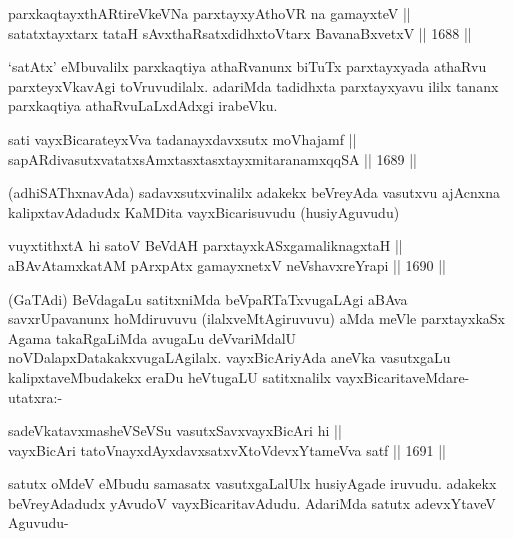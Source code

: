\begin{shl}
parxkaqtayxthARtireVkeVNa parxtayxyAthoVR na gamayxteV || \\
satatxtayxtarx tataH sAvxthaRsatxdidhxtoV\s tarx BavanaBxvetxV ||  1688 ||  
\end{shl}

\begin{artha}
`satAtx' eMbuvalilx parxkaqtiya athaRvanunx biTuTx parxtayxyada athaRvu parxteyxVkavAgi toVruvudilalx. adariMda tadidhxta parxtayxyavu ililx tananx parxkaqtiya athaRvuLaLxdAdxgi irabeVku.
\end{artha}

\begin{shl}
sati vayxBicarateyxVva tadanayxdavxsutx moVhajamf || \\
sapARdivasutxvatatxsAmxtasxtasxtayxmitaranamxqqSA ||  1689 ||  
\end{shl}

\begin{artha}
(adhiSAThxnavAda) sadavxsutxvinalilx adakekx beVreyAda vasutxvu ajAcnxna kalipxtavAdadudx KaMDita vayxBicarisuvudu (husiyAguvudu)
\end{artha}

\begin{shl}
vuyxtithxtA hi satoV BeVdAH parxtayxkASxgamaliknagxtaH ||  \\
aBAvAtamxkatAM pArxpAtx gamayxnetxV neVshavxreYrapi ||  1690 ||  
\end{shl}

\begin{artha}
(GaTAdi) BeVdagaLu satitxniMda beVpaRTaTxvugaLAgi aBAva savxrUpavanunx hoMdiruvuvu (ilalxveMtAgiruvuvu) aMda meVle parxtayxkaSx Agama takaRgaLiMda avugaLu deVvariMdalU noVDalapxDatakakxvugaLAgilalx. vayxBicAriyAda aneVka vasutxgaLu kalipxtaveMbudakekx eraDu heVtugaLU satitxnalilx vayxBicaritaveMdare- utatxra:-
\end{artha}

\begin{shl}
sadeVkatavxmasheVSeVSu vasutxSavxvayxBicAri hi ||  \\
vayxBicAri tatoVnayxdAyxdavxsatxvXtoV\s devxYtameVva satf ||  1691 ||  
\end{shl}

\begin{artha}
satutx oMdeV eMbudu samasatx vasutxgaLalUlx husiyAgade iruvudu. adakekx beVreyAdadudx yAvudoV vayxBicaritavAdudu. AdariMda satutx adevxYtaveV Aguvudu-
\end{artha}

